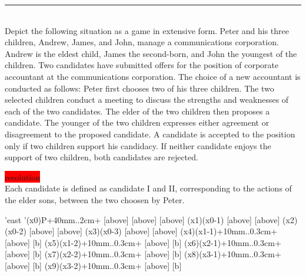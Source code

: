 \documentclass[10pt]{report}
\newenvironment{exercise}[1]
    {\vspace{0.5cm}\hrule\vspace{0.5cm}\noindent\fbox{#1}\\}
    {\vspace{0.5cm}}
\newenvironment{response}
{\vspace{0.2cm}\noindent\colorbox{red}{resolution}}
    {\vspace{0.5cm}}
\begin{document}
\begin{exercise}{3.4}
	Depict the following situation as a game in extensive form. Peter and his three children, Andrew, James, and John, manage a communications corporation. Andrew is the eldest child, James the second-born, and John the youngest of the children. Two candidates have submitted offers for the position of corporate accountant at the communications corporation. The choice of a new accountant is conducted as follows: Peter first chooses two of his three children. The two selected children conduct a meeting to discuss the strengths and weaknesses of each of the two candidates. The elder of the two children then proposes a candidate. The younger of the two children expresses either agreement or disagreement to the proposed candidate. A candidate is accepted to the position only if two children support his candidacy. If neither candidate enjoys the support of two children, both candidates are rejected.

	\begin{response}\\
		Each candidate is defined as candidate I and II, corresponding to the actions of the elder sons, between the two choosen by Peter.

		\vspace{0.5cm}
		\begin{istgame}[sloped,font=\tiny]
			\setistgrowdirection'{east}
			\setistOvalNodeStyle{.6cm}
			\istrooto'(x0){P}+{40mm}..{2cm}+
			[above]
			[above]
			[above]
			\endist
			\xtShowEndPoints[oval node, minimum size=6pt]
			\xtdistance{30mm}{8mm}
			\istrooto(x1)(x0-1){}
			[above]
			[above]
			\endist
			\istrooto(x2)(x0-2){}
			[above]
			[above]
			\endist
			\istrooto(x3)(x0-3){}
			[above]
			[above]
			\endist
			\istrooto(x4)(x1-1){}+{10mm}..{0.3cm}+
			[above]{}
			[b]{}
			\endist
			\istrooto(x5)(x1-2){}+{10mm}..{0.3cm}+
			[above]{}
			[b]{}
			\endist
			\istrooto(x6)(x2-1){}+{10mm}..{0.3cm}+
			[above]{}
			[b]{}
			\endist
			\istrooto(x7)(x2-2){}+{10mm}..{0.3cm}+
			[above]{}
			[b]{}
			\endist
			\istrooto(x8)(x3-1){}+{10mm}..{0.3cm}+
			[above]{}
			[b]{}
			\endist
			\istrooto(x9)(x3-2){}+{10mm}..{0.3cm}+
			[above]{}
			[b]{}
			\endist
		\end{istgame}
	\end{response}

\end{exercise}
\end{document}
